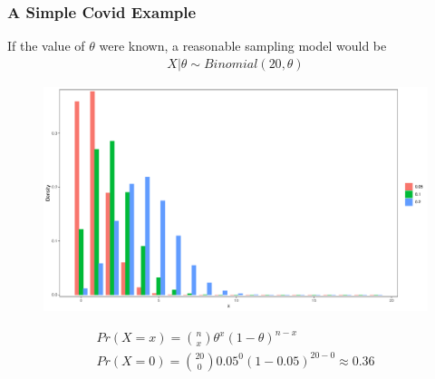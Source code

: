 \documentclass[
  shownotes,
  xcolor={svgnames},
  hyperref={colorlinks,citecolor=DarkBlue,linkcolor=DarkRed,urlcolor=DarkBlue}
  ]{beamer}
\begin{document}
\begin{frame}[fragile]
\frametitle{A Simple Covid Example}

 If the value of $\theta$ were known, a reasonable sampling model would be
 \begin{align}
 X|\theta \sim Binomial(20,\theta)
 \end{align}

 \begin{figure}[H] \centering
  \centering
  \includegraphics[scale=0.25]{figures/fig_1}
  \\
  \tiny 
\end{figure}

\tiny
 \begin{align}
 Pr(X=x)= \binom{n}{x}\theta^x(1-\theta)^{n-x} \\
 Pr(X=0)= \binom{20}{0}0.05^0(1-0.05)^{20-0} \approx 0.36
 \end{align}

\end{frame}
\end{document}
